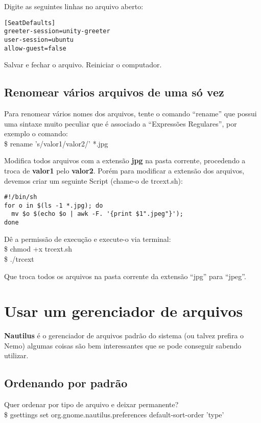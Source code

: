 Digite as seguintes linhas no arquivo aberto:
\begin{lstlisting}
[SeatDefaults]  
greeter-session=unity-greeter  
user-session=ubuntu  
allow-guest=false
\end{lstlisting}
Salvar e fechar o arquivo. Reiniciar o computador.

\subsection{Renomear vários arquivos de uma só vez}
Para renomear vários nomes dos arquivos, tente o comando ``rename'' que possui uma sintaxe muito peculiar que é associado a ``Expressões Regulares'', por exemplo o comando: \\
{\ttfamily\$ rename 's/valor1/valor2/' *.jpg}

Modifica todos arquivos com a extensão \textbf{jpg} na pasta corrente, procedendo a troca de \textbf{valor1} pelo \textbf{valor2}. Porém para modificar a extensão dos arquivos, devemos criar um seguinte Script (chame-o de trcext.sh):
\begin{lstlisting}
#!/bin/sh
for o in $(ls -1 *.jpg); do
  mv $o $(echo $o | awk -F. '{print $1".jpeg"}');
done
\end{lstlisting}

Dê a permissão de execução e execute-o via terminal: \\
{\ttfamily\$ chmod +x trcext.sh \\
\$ ./trcext}

Que troca todos os arquivos na pasta corrente da extensão ``jpg'' para ``jpeg''.

\section{Usar um gerenciador de arquivos}
\textbf{Nautilus} é o gerenciador de arquivos padrão do sistema (ou talvez prefira o Nemo) algumas coisas são bem interessantes que se pode conseguir sabendo utilizar.

\subsection{Ordenando por padrão}
Quer ordenar por tipo de arquivo e deixar permanente? \\
{\ttfamily\$ gsettings set org.gnome.nautilus.preferences default-sort-order 'type'}

